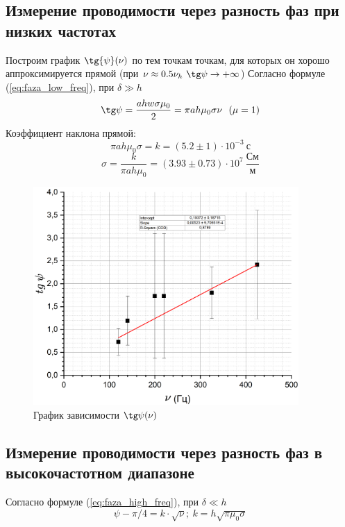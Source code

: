 \documentclass[a4paper, 12pt]{article}
\begin{document}
	\subsection*{Измерение проводимости через разность фаз при низких частотах}
	Построим график $\tg{\psi} (\nu)$ по тем точкам точкам, для которых он хорошо аппроксимируется прямой (при $\nu \approx 0.5 \nu_h \ \tg \psi \rightarrow +\infty$) 
	Согласно формуле (\ref{eq:faza_low_freq}), при $\delta \gg h$
	\begin{equation*}
		\tg \psi = \frac{ahw \sigma \mu_0}{2} = \pi ah\mu_0\sigma \nu \ \ (\mu = 1)
	\end{equation*}
	Коэффициент наклона прямой: \[\pi ah \mu_0\sigma = k = (5.2 \pm 1) \cdot 10^{-3} \ \text{с}\]
	\[\sigma = \frac{k}{\pi ah \mu_0} = (3.93 \pm 0.73) \cdot 10^7 \ \frac{\text{См}}{\text{м}}\]
	\begin{figure}[H]
		\centering
		\includegraphics[width=0.9\textwidth, height = 0.45\textheight]{Phase_diff_1}
		\caption{График зависимости $\tg \psi (\nu)$}\label{fig:tg_psi_nu_line}
	\end{figure}

	\subsection*{Измерение проводимости через разность фаз в высокочастотном диапазоне}
	Согласно формуле (\ref{eq:faza_high_freq}), при $\delta \ll h$
	\begin{equation*}
		\psi - \pi/4 = k\cdot \sqrt{\nu}; \ k = h\sqrt{\pi\mu_0\sigma}
	\end{equation*}
	
\end{document}
